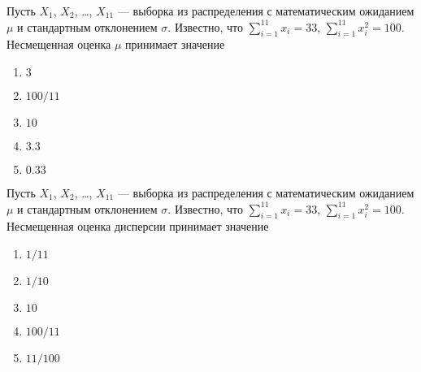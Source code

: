 \documentclass[t]{beamer}
\begin{document}
 \begin{frame} \label{33} 
\begin{block}{33} 

Пусть $X_1$, $X_2$, \ldots, $X_{11}$ — выборка из распределения с математическим ожиданием $\mu$ и стандартным отклонением $\sigma$. Известно, что $\sum_{i=1}^{11}x_i=33$, $\sum_{i=1}^{11}x_i^2=100$. Несмещенная оценка $\mu$ принимает значение
 


 \end{block} 
\begin{enumerate} 
\item[] \hyperlink{33-Yes}{\beamergotobutton{} $3$}
\item[] \hyperlink{33-No}{\beamergotobutton{} $100/11$}
\item[] \hyperlink{33-No}{\beamergotobutton{} $10$}
\item[] \hyperlink{33-No}{\beamergotobutton{} $3.3$}
\item[] \hyperlink{33-No}{\beamergotobutton{} $0.33$}
\end{enumerate} 
\end{frame} 


 \begin{frame} \label{34} 
\begin{block}{34} 

Пусть $X_1$, $X_2$, \ldots, $X_{11}$ — выборка из распределения с математическим ожиданием $\mu$ и стандартным отклонением $\sigma$. Известно, что $\sum_{i=1}^{11}x_i=33$, $\sum_{i=1}^{11}x_i^2=100$. Несмещенная оценка дисперсии принимает значение
 


 \end{block} 
\begin{enumerate} 
\item[] \hyperlink{34-No}{\beamergotobutton{} $1/11$}
\item[] \hyperlink{34-Yes}{\beamergotobutton{} $1/10$}
\item[] \hyperlink{34-No}{\beamergotobutton{} $10$}
\item[] \hyperlink{34-No}{\beamergotobutton{} $100/11$}
\item[] \hyperlink{34-No}{\beamergotobutton{} $11/100$}
\end{enumerate} 
\end{frame} 
\end{document}
